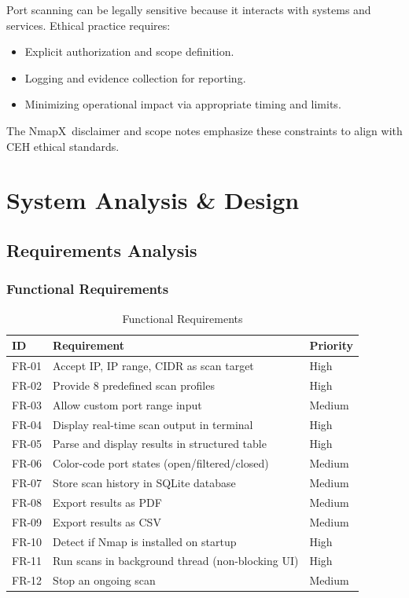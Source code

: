 \documentclass[12pt, a4paper]{report}
\newcommand{\NmapX}{NmapX}
\begin{document}
Port scanning can be legally sensitive because it interacts with systems and services. Ethical practice requires:
\begin{itemize}[leftmargin=2.2em]
  \item Explicit authorization and scope definition.
  \item Logging and evidence collection for reporting.
  \item Minimizing operational impact via appropriate timing and limits.
\end{itemize}
The \NmapX\ disclaimer and scope notes emphasize these constraints to align with CEH ethical standards.

\clearpage
\chapter{System Analysis \& Design}

\section{Requirements Analysis}

\subsection{Functional Requirements}
\begin{table}[H]
  \centering
  \caption{Functional Requirements}
  \label{tab:functional-requirements}
  \begin{tabularx}{\textwidth}{@{}lXl@{}}
    \toprule
    \textbf{ID} & \textbf{Requirement} & \textbf{Priority} \\
    \midrule
    FR-01 & Accept IP, IP range, CIDR as scan target & High \\
    FR-02 & Provide 8 predefined scan profiles & High \\
    FR-03 & Allow custom port range input & Medium \\
    FR-04 & Display real-time scan output in terminal & High \\
    FR-05 & Parse and display results in structured table & High \\
    FR-06 & Color-code port states (open/filtered/closed) & Medium \\
    FR-07 & Store scan history in SQLite database & Medium \\
    FR-08 & Export results as PDF & Medium \\
    FR-09 & Export results as CSV & Medium \\
    FR-10 & Detect if Nmap is installed on startup & High \\
    FR-11 & Run scans in background thread (non-blocking UI) & High \\
    FR-12 & Stop an ongoing scan & Medium \\
    \bottomrule
  \end{tabularx}
\end{table}
\end{document}
